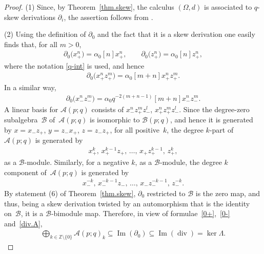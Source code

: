 \documentclass[pdftex]{sigma}
\numberwithin{equation}{section}
\def\Weyl#1#2{{\mathcal{B}}(#1;#2)}
\def\AWeyl#1#2{{\mathcal{A}}(#1;#2)}
\begin{document}
\begin{proof}
(1) Since, by Theorem~\ref{thm.skew}, the calculus $(\Omega ,d)$ is associated to $q$-skew derivations $\partial_i$, the assertion follows from \cite[Theorem~3.4]{BrzElK:int}.

(2) Using the def\/inition of $\partial_0$ and the fact that it is a skew derivation one easily f\/inds that, for all $m >0$,
\begin{gather*}
\partial_0\big(x_+^n\big) = \alpha_0 [n] x_+^n, \qquad \partial_0\big(z_+^n\big) = \alpha_0 [n] z_+^n,
\end{gather*}
where the notation \eqref{q-int} is used, and hence
\begin{gather}\label{0+}
\partial_0\big(x_+^nz_+^m\big) = \alpha_0 [m+n] x_+^nz_+^m.
\end{gather}
In a similar way,
\begin{gather}\label{0-}
\partial_0\big(x_-^nz_-^m\big) = \alpha_0 q^{-2(m+n-1)} [m+n] x_-^nz_-^m.
\end{gather}
A linear basis for $\AWeyl p q$ consists of $x_-^nz_+^mz_-^l$, $x_+^nz_+^mz_-^l$. Since the degree-zero subalgebra~${\mathcal{B}}$ of~$\AWeyl p q$ is isomorphic to $\Weyl p q$, and hence it is generated by $x=x_-z_+$, $y = z_-x_+$, $z=z_-z_+$, for all positive~$k$, the degree $k$-part of $\AWeyl p q$ is generated by
\begin{gather*}
x_+^k, \,x_+^{k-1}z_+,\, \ldots ,\, x_+z_+^{k-1},\, z_+^k,
\end{gather*}
as a ${\mathcal{B}}$-module. Similarly, for a negative $k$, as a ${\mathcal{B}}$-module, the degree $k$ component of~$\AWeyl p q$ is generated by
\begin{gather*}
x_-^{-k},\, x_-^{-k-1}z_-, \,\ldots ,\, x_-z_-^{-k-1},\, z_-^{-k}.
\end{gather*}
By statement (6) of Theorem~\ref{thm.skew}, $\partial_0$ restricted to ${\mathcal{B}}$ is the zero map, and thus, being a skew derivation twisted by an automorphism that is the identity on~${\mathcal{B}}$, it is a ${\mathcal{B}}$-bimodule map. Therefore, in view of formulae~\eqref{0+},~\eqref{0-} and~\eqref{div.A},
\begin{gather}\label{not0}
\bigoplus_{k\in {\mathbb Z}\setminus \{0\}} \AWeyl p q _k \subseteq \operatorname{Im} (\partial_0 )\subseteq \operatorname{Im} (\operatorname{div} )= \ker \Lambda.
\end{gather}


\end{proof}
\end{document}
